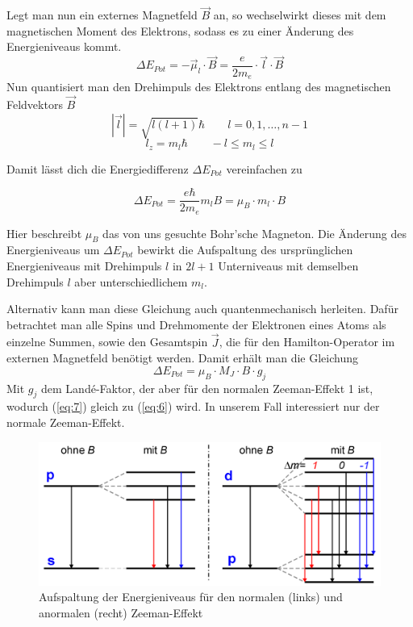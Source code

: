 Legt man nun ein externes Magnetfeld $\vec{B}$ an, so wechselwirkt dieses mit dem magnetischen Moment des Elektrons, sodass es zu einer Änderung des Energieniveaus kommt.
\begin{equation} \label{eq:3}
\Delta E_{Pot} = -\vec{\mu}_l \cdot \vec{B} = \frac{e}{2m_e} \cdot \vec{l} \cdot \vec{B}
\end{equation}
Nun quantisiert man den Drehimpuls des Elektrons entlang des magnetischen Feldvektors $\vec{B}$
\begin{equation} \label{eq:4}
|\vec{l}| = \sqrt{l(l+1)}\hbar \qquad l = 0, 1,…, n-1
\end{equation}
\begin{equation} \label{eq:5}
l_z = m_l \hbar \qquad -l \leq m_l \leq l
\end{equation}

Damit lässt dich die Energiedifferenz $\Delta E_{Pot}$ vereinfachen zu

\begin{equation} \label{eq:6}
\Delta E_{Pot} = \frac{e \hbar}{2 m_e} m_l B = \mu_B \cdot m_l \cdot B
\end{equation}

Hier beschreibt $\mu_B$ das von uns gesuchte Bohr'sche Magneton.
Die Änderung des Energieniveaus um $\Delta E_{Pot}$ bewirkt die Aufspaltung des ursprünglichen Energieniveaus mit Drehimpuls $l$ in $2l+1$ Unterniveaus mit demselben Drehimpuls $l$ aber unterschiedlichem $m_l$.

Alternativ kann man diese Gleichung auch quantenmechanisch herleiten. Dafür betrachtet man alle Spins und Drehmomente der Elektronen eines Atoms als einzelne Summen, sowie den Gesamtspin $\vec{J}$, die für den Hamilton-Operator im externen Magnetfeld benötigt werden. Damit erhält man die Gleichung
\begin{equation} \label{eq:7}
\Delta E_{Pot} = \mu_B \cdot M_J \cdot B \cdot g_j
\end{equation}
 Mit $g_j$ dem Landé-Faktor, der aber für den normalen Zeeman-Effekt 1 ist, wodurch (\ref{eq:7}) gleich zu (\ref{eq:6}) wird. In unserem Fall interessiert nur der normale Zeeman-Effekt.
 
 \begin{figure}
  \includegraphics[width=\linewidth]{images/ZeemanAufspaltung.png}
  \caption{\cite{UniStuttgart} Aufspaltung der Energieniveaus für den normalen (links) und anormalen (recht) Zeeman-Effekt}
  \label{fig:Energieniveaus}
\end{figure}


